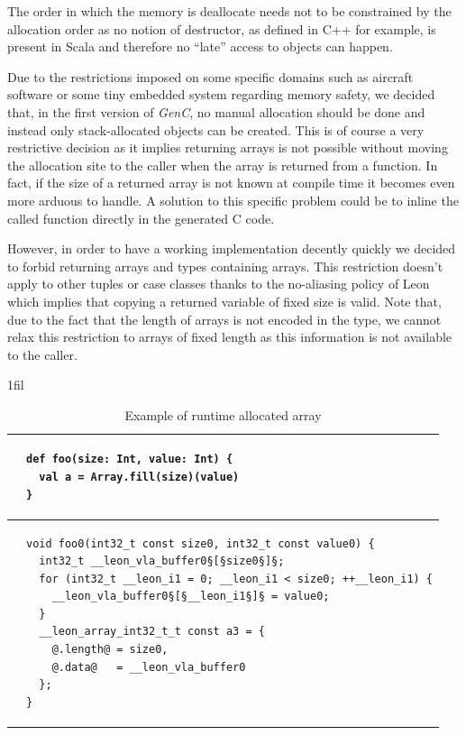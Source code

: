 \documentclass{article}
\makeatletter
\newcommand{\vheading}[1]{\rotatebox[origin=c]{90}{~\textbf{#1}~}}
\newcommand*{\centerfloat}{%
  \parindent \z@
  \leftskip \z@ \@plus 1fil \@minus \textwidth
  \rightskip\leftskip
  \parfillskip \z@skip}
\newcommand{\GenC}{\emph{GenC}\xspace}
\makeatother
\begin{document}
The order in which the memory is deallocate needs not to be constrained by the
allocation order as no notion of destructor, as defined in C++ for example, is
present in Scala and therefore no ``late'' access to objects can happen.

Due to the restrictions imposed on some specific domains such as aircraft
software or some tiny embedded system regarding memory safety, we decided that,
in the first version of \GenC, no manual allocation should be done and instead
only stack-allocated objects can be created. This is of course a very
restrictive decision as it implies returning arrays is not possible without
moving the allocation site to the caller when the array is returned from a
function. In fact, if the size of a returned array is not known at compile time
it becomes even more arduous to handle. A solution to this specific problem
could be to inline the called function directly in the generated C code.

However, in order to have a working implementation decently quickly we decided
to forbid returning arrays and types containing arrays. This restriction doesn't
apply to other tuples or case classes thanks to the no-aliasing policy of Leon
which implies that copying a returned variable of fixed size is valid. Note that,
due to the fact that the length of arrays is not encoded in the type, we cannot
relax this restriction to arrays of fixed length as this information is not
available to the caller.

\begin{table}[t]
  \centerfloat
  \begin{tabular}{@{} c || l}
    \toprule

    \vheading{Scala} &
    \begin{lstlisting}[language=MyScala]
def foo(size: Int, value: Int) {
  val a = Array.fill(size)(value)
}
    \end{lstlisting} \\

    \midrule

    \vheading{C99} &
    \begin{lstlisting}[language=C99]
void foo0(int32_t const size0, int32_t const value0) {
  int32_t __leon_vla_buffer0§[§size0§]§;
  for (int32_t __leon_i1 = 0; __leon_i1 < size0; ++__leon_i1) {
    __leon_vla_buffer0§[§__leon_i1§]§ = value0;
  }
  __leon_array_int32_t_t const a3 = {
    @.length@ = size0,
    @.data@   = __leon_vla_buffer0
  };
}
    \end{lstlisting} \\

    \bottomrule
  \end{tabular}
  \caption{Example of runtime allocated array}
  \label{tab:vla}
\end{table}
\end{document}
